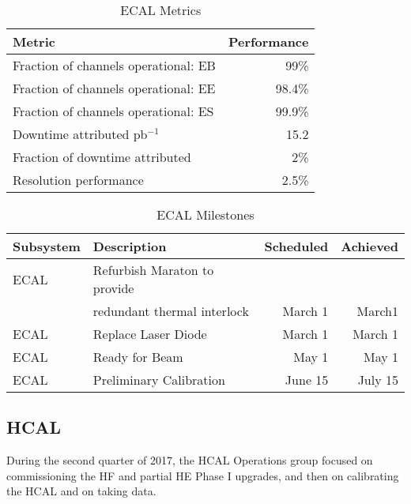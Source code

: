\vskip 0.2in


\begin{table}[htp]
\caption{ECAL Metrics}
\begin{center}
\begin{tabular}{|l|r|}
\hline
Metric&Performance\\
\hline
Fraction of channels operational: EB& 99\% \\
\hline
Fraction of channels operational: EE& 98.4\%\\
\hline
Fraction of channels operational: ES& 99.9\%\\
\hline
Downtime attributed pb$^{-1}$ & 15.2 \\
Fraction of downtime attributed& 2\% \\
\hline
Resolution performance & 2.5\% \\
\hline
\end{tabular}
\end{center}
\label{ECALMetrics}
\end{table}%


\begin{table}[htp]
\caption{ECAL Milestones}
\begin{center}
\begin{tabular}{|l|l|r|r|}
\hline
Subsystem&Description&Scheduled&Achieved\\
\hline
ECAL & Refurbish Maraton to provide& &\\
     & redundant thermal interlock &March 1& March1 \\
\hline
ECAL & Replace Laser Diode & March 1& March 1\\
\hline
ECAL & Ready for Beam& May 1& May  1 \\
\hline
ECAL & Preliminary Calibration& June 15& July 15 \\
\hline
\end{tabular}
\end{center}
\label{ECALMilestones}
\end{table}%



\subsection{HCAL}




During the second quarter of 2017, the HCAL Operations group focused on commissioning
the HF and partial HE Phase I upgrades, and then on calibrating the HCAL and on taking data.

\vspace*{2mm}

